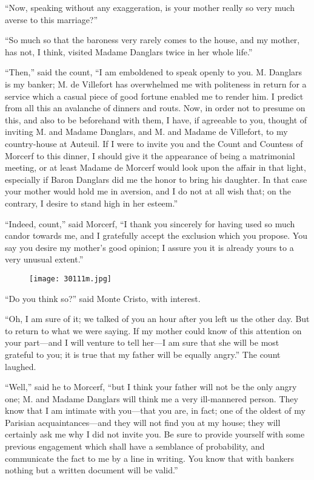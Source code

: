 “Now, speaking without any exaggeration, is your mother really so very
much averse to this marriage?”

“So much so that the baroness very rarely comes to the house, and my
mother, has not, I think, visited Madame Danglars twice in her whole
life.”

“Then,” said the count, “I am emboldened to speak openly to you. M.
Danglars is my banker; M. de Villefort has overwhelmed me with
politeness in return for a service which a casual piece of good fortune
enabled me to render him. I predict from all this an avalanche of
dinners and routs. Now, in order not to presume on this, and also to be
beforehand with them, I have, if agreeable to you, thought of inviting
M. and Madame Danglars, and M. and Madame de Villefort, to my
country-house at Auteuil. If I were to invite you and the Count and
Countess of Morcerf to this dinner, I should give it the appearance of
being a matrimonial meeting, or at least Madame de Morcerf would look
upon the affair in that light, especially if Baron Danglars did me the
honor to bring his daughter. In that case your mother would hold me in
aversion, and I do not at all wish that; on the contrary, I desire to
stand high in her esteem.”

“Indeed, count,” said Morcerf, “I thank you sincerely for having used
so much candor towards me, and I gratefully accept the exclusion which
you propose. You say you desire my mother’s good opinion; I assure you
it is already yours to a very unusual extent.”

\begin{figure}[ht]
\texttt{[image: 30111m.jpg]}
\end{figure}

“Do you think so?” said Monte Cristo, with interest.

“Oh, I am sure of it; we talked of you an hour after you left us the
other day. But to return to what we were saying. If my mother could
know of this attention on your part—and I will venture to tell her—I am
sure that she will be most grateful to you; it is true that my father
will be equally angry.” The count laughed.

“Well,” said he to Morcerf, “but I think your father will not be the
only angry one; M. and Madame Danglars will think me a very
ill-mannered person. They know that I am intimate with you—that you
are, in fact; one of the oldest of my Parisian acquaintances—and they
will not find you at my house; they will certainly ask me why I did not
invite you. Be sure to provide yourself with some previous engagement
which shall have a semblance of probability, and communicate the fact
to me by a line in writing. You know that with bankers nothing but a
written document will be valid.”

